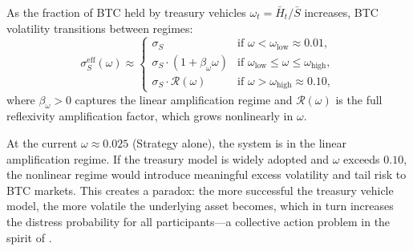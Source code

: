 \begin{proposition}\label{prop:vol_regime}
As the fraction of BTC held by treasury vehicles
$\omega_t = \bar{H}_t / \bar{S}$ increases, BTC volatility transitions
between regimes:
\begin{equation}\label{eq:vol_regimes}
  \sigma_S^{\mathrm{eff}}(\omega) \approx
  \begin{cases}
    \sigma_S & \text{if } \omega < \omega_{\mathrm{low}} \approx 0.01, \\
    \sigma_S \cdot (1 + \beta_\omega \omega) & \text{if }
      \omega_{\mathrm{low}} \le \omega \le \omega_{\mathrm{high}}, \\
    \sigma_S \cdot \mathcal{R}(\omega) & \text{if }
      \omega > \omega_{\mathrm{high}} \approx 0.10,
  \end{cases}
\end{equation}
where $\beta_\omega > 0$ captures the linear amplification regime and
$\mathcal{R}(\omega)$ is the full reflexivity amplification factor, which
grows nonlinearly in $\omega$.
\end{proposition}

\begin{remark}
At the current $\omega \approx 0.025$ (Strategy alone), the system is
in the linear amplification regime.  If the treasury model is widely
adopted and $\omega$ exceeds $0.10$, the nonlinear regime would introduce
meaningful excess volatility and tail risk to BTC markets.  This creates
a paradox: the more successful the treasury vehicle model, the more
volatile the underlying asset becomes, which in turn increases the
distress probability for all participants---a collective action problem
in the spirit of \citet{brunnermeier2009market}.
\end{remark}
